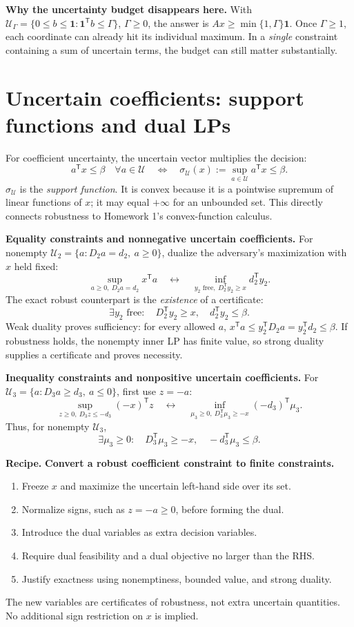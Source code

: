 \documentclass[11pt]{article}
\newenvironment{recipe}{\begin{framed}\noindent\textbf{Recipe.} }{\end{framed}}
\newcommand{\T}{^{\mathsf T}}
\newcommand{\ones}{\mathbf 1}
\begin{document}
\textbf{Why the uncertainty budget disappears here.} With
$\mathcal U_\Gamma=\{0\le b\le\ones:\ones\T b\le\Gamma\}$,
$\Gamma\ge0$, the answer is $Ax\ge\min\{1,\Gamma\}\ones$.
Once $\Gamma\ge1$, each coordinate can already hit its individual maximum.
In a \emph{single} constraint containing a sum of uncertain terms, the
budget can still matter substantially.

\newpage
\section{Uncertain coefficients: support functions and dual LPs}
For coefficient uncertainty, the uncertain vector multiplies the decision:
\[
a\T x\le\beta\quad\forall a\in\mathcal U
\quad\Longleftrightarrow\quad
\sigma_{\mathcal U}(x):=\sup_{a\in\mathcal U}a\T x\le\beta.
\]
$\sigma_{\mathcal U}$ is the \emph{support function}. It is convex because
it is a pointwise supremum of linear functions of $x$; it may equal
$+\infty$ for an unbounded set. This directly connects robustness to
Homework 1's convex-function calculus.

\textbf{Equality constraints and nonnegative uncertain coefficients.}
For nonempty $\mathcal U_2=\{a:D_2a=d_2,\ a\ge0\}$, dualize the
adversary's maximization with $x$ held fixed:
\[
\sup_{a\ge0,\ D_2a=d_2}x\T a
\quad\longleftrightarrow\quad
\inf_{y_2\text{ free},\ D_2\T y_2\ge x}d_2\T y_2.
\]
The exact robust counterpart is the \emph{existence} of a certificate:
\[
\boxed{\exists y_2\text{ free}:\quad D_2\T y_2\ge x,\quad d_2\T y_2\le\beta.}
\]
Weak duality proves sufficiency: for every allowed $a$,
$x\T a\le y_2\T D_2a=y_2\T d_2\le\beta$.
If robustness holds, the nonempty inner LP has finite value, so strong
duality supplies a certificate and proves necessity.

\textbf{Inequality constraints and nonpositive uncertain coefficients.}
For $\mathcal U_3=\{a:D_3a\ge d_3,\ a\le0\}$, first use $z=-a$:
\[
\sup_{z\ge0,\ D_3z\le-d_3}(-x)\T z
\quad\longleftrightarrow\quad
\inf_{\mu_3\ge0,\ D_3\T\mu_3\ge-x}(-d_3)\T\mu_3.
\]
Thus, for nonempty $\mathcal U_3$,
\[
\boxed{\exists\mu_3\ge0:\quad D_3\T\mu_3\ge-x,\quad-d_3\T\mu_3\le\beta.}
\]

\begin{recipe}
\textbf{Convert a robust coefficient constraint to finite constraints.}
\begin{enumerate}
\item Freeze $x$ and maximize the uncertain left-hand side over its set.
\item Normalize signs, such as $z=-a\ge0$, before forming the dual.
\item Introduce the dual variables as extra decision variables.
\item Require dual feasibility and a dual objective no larger than the RHS.
\item Justify exactness using nonemptiness, bounded value, and strong duality.
\end{enumerate}
\end{recipe}
The new variables are certificates of robustness, not extra uncertain
quantities. No additional sign restriction on $x$ is implied.
\end{document}
